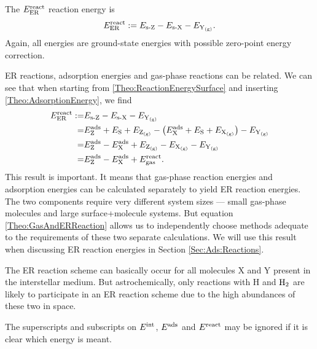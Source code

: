 The $E^{\text{react}}_{\text{ER}}$ reaction energy is
\begin{equation}
 E^{\text{react}}_{\text{ER}}:= E_{\text{s-}\text Z} - E_{\text{s-}\text X} - E_{\text Y_\text{(g)}}.
 \label{Theo:ReactionEnergySurface}
\end{equation}
Again, all energies are ground-state energies with possible zero-point energy
correction.

ER reactions, adsorption energies and gas-phase reactions can be related. We can see
that when starting from \eqref{Theo:ReactionEnergySurface} and inserting
\eqref{Theo:AdsorptionEnergy}, we find
\begin{equation}
 \begin{aligned}
   E^{\text{react}}_{\text{ER}}:=& E_{\text{s-}\text Z} - E_{\text{s-}\text X} - E_{\text Y_\text{(g)}}\\
   =& E^{\text{ads}}_{\text Z}+E_{\text S} + E_{\text Z_\text{(g)}} - \left({E^{\text{ads}}_{\text X} +E_{\text S} + E_{\text X_\text{(g)}}}\right) - E_{\text Y_\text{(g)}}\\
   =& E^{\text{ads}}_{\text Z}-E^{\text{ads}}_{\text X} + E_{\text Z_\text{(g)}} - E_{\text X_\text{(g)}} - E_{\text Y_\text{(g)}}\\
   =& E^{\text{ads}}_{\text Z}-E^{\text{ads}}_{\text X} + E^{\text{react}}_{\text{gas}}.
 \end{aligned}
 \label{Theo:GasAndERReaction}
\end{equation}
This result is important. It means that gas-phase reaction energies and
adsorption energies can be calculated separately to yield ER reaction energies.
The two components require very different system sizes --- small gas-phase
molecules and large surface+molecule systems. But equation
\eqref{Theo:GasAndERReaction} allows us to independently choose methods
adequate to the requirements of these two separate calculations.
We will use this result when discussing ER reaction energies in Section
\ref{Sec:Ads:Reactions}.

The ER reaction scheme can basically occur for all molecules X and Y present in
the interstellar medium. But astrochemically, only reactions with H and $\text H_2$
are likely to participate in an ER reaction scheme due to the high
abundances of these two in space.

The superscripts and subscripts on $E^{\text{int}}$, $E^{\text{ads}}$ and $E^{\text{react}}$ may be ignored
if it is clear which energy is meant.

